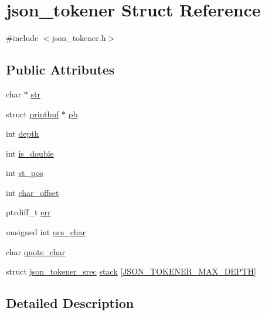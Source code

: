 \hypertarget{structjson__tokener}{}\section{json\+\_\+tokener Struct Reference}
\label{structjson__tokener}


{\ttfamily \#include $<$json\+\_\+tokener.\+h$>$}

\subsection*{Public Attributes}
\begin{DoxyCompactItemize}
\item 
char $\ast$ \hyperlink{structjson__tokener_a9772e2170322a19d8da6ce5d7dc46895}{str}
\item 
struct \hyperlink{structprintbuf}{printbuf} $\ast$ \hyperlink{structjson__tokener_a1cdc7f85d7bde95f81bb08b7e61d6684}{pb}
\item 
int \hyperlink{structjson__tokener_ae0e5102b44cc1fc680be3e0fb5fff028}{depth}
\item 
int \hyperlink{structjson__tokener_ad3bf0aa728ea14549d5aa6ca8dcba070}{is\+\_\+double}
\item 
int \hyperlink{structjson__tokener_a8eed213c0a37d09c1df66c8567e44471}{st\+\_\+pos}
\item 
int \hyperlink{structjson__tokener_a9daae2516fd6df23555d33ef01020a76}{char\+\_\+offset}
\item 
ptrdiff\+\_\+t \hyperlink{structjson__tokener_acc71f03c5d2edbcb5a036a906e8c2faf}{err}
\item 
unsigned int \hyperlink{structjson__tokener_a32fa73e43fb760e6845231a8482eb064}{ucs\+\_\+char}
\item 
char \hyperlink{structjson__tokener_aea488b73085ac7c5969ae7fc29e25fa0}{quote\+\_\+char}
\item 
struct \hyperlink{structjson__tokener__srec}{json\+\_\+tokener\+\_\+srec} \hyperlink{structjson__tokener_a1499f97597246a18357b874e1805a678}{stack} \mbox{[}\hyperlink{json__tokener_8h_ac4299cf4ed799b028e61cf7b2b0d5f1f}{J\+S\+O\+N\+\_\+\+T\+O\+K\+E\+N\+E\+R\+\_\+\+M\+A\+X\+\_\+\+D\+E\+P\+TH}\mbox{]}
\end{DoxyCompactItemize}


\subsection{Detailed Description}


